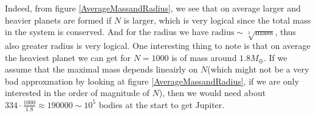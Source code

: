 Indeed, from figure \ref{AverageMassandRadius}, we see that on average larger and heavier planets are formed if $N$ is larger, which is very logical since the total mass in the system is conserved. And for the radius we have $\text{radius} \sim \sqrt[3]{\text{mass}}$, thus also greater radius is very logical. One interesting thing to note is that on average the heaviest planet we can get for $N=1000$ is of mass around $1.8M_{\oplus}$. If we assume that the maximal mass depends lineairly on $N$(which might not be a very bad approxmation by looking at figure \ref{AverageMassandRadius}, if we are only interested in the order of magnitude of $N$), then we would need about $334\cdot \frac{1000}{1.8}\approx 190000\sim 10^5$ bodies at the start to get Jupiter. 